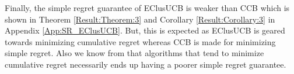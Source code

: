 Finally, the simple regret guarantee of EClusUCB is weaker than CCB\cite{liu2016modification} which is shown in Theorem \ref{Result:Theorem:3} and Corollary \ref{Result:Corollary:3} in Appendix \ref{App:SR_EClusUCB}. But, this is expected as EClusUCB is geared towards minimizing cumulative regret whereas CCB is made for minimizing simple regret. Also we know from \cite{bubeck2009pure} that algorithms that tend to minimize cumulative regret necessarily ends up having a poorer simple regret guarantee. 

